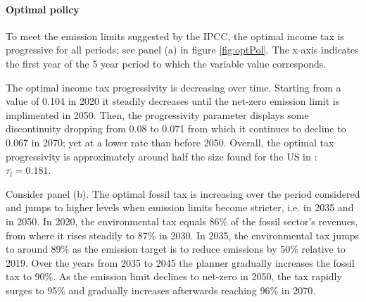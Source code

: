 \begin{figure}[h!!]
\end{figure} 

\paragraph{Optimal policy}
To meet the emission limits suggested by the IPCC, the optimal income tax is progressive for all periods; see panel (a) in figure \ref{fig:optPol}.  The x-axis indicates the first year of the 5 year period to which the variable value corresponds. 

The optimal income tax progressivity is decreasing over time. Starting from a value of 0.104 in 2020 it steadily decreases until the net-zero emission limit is implimented in 2050. Then, the progressivity parameter displays some discontinuity dropping from 0.08 to 0.071 from which it continues to decline to 0.067 in 2070; yet at a lower rate than before 2050. 
Overall, the optimal tax progressivity is approximately  around half the size found for the US in \cite{Heathcote2017OptimalFramework}: $\tau_{l}=0.181$.

Consider panel (b). The optimal fossil tax is increasing over the period considered and jumps to higher levels when emission limits become stricter, i.e. in 2035 and in 2050.
In 2020, the environmental tax equals 86\% of the fossil sector's revenues, from where it rises steadily to 87\% in 2030.  In 2035, the environmental tax jumps to around 89\% as the emission target is to reduce emissions by 50\% relative to 2019. Over the years from 2035 to 2045 the planner gradually increases the fossil tax to 90\%. As the emission limit declines to net-zero in 2050, the tax rapidly surges to 95\% and gradually increases afterwards reaching 96\% in 2070. 

